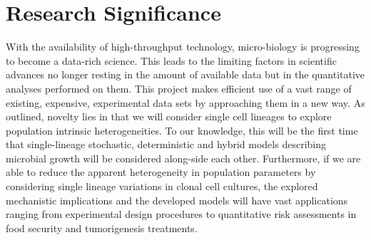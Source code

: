 \documentclass{bioinfo}
\begin{document}
\section{Research Significance}
With the availability of high-throughput technology, micro-biology is progressing to become a data-rich science. This leads to the limiting factors in scientific advances no longer resting in the amount of available data but in the quantitative analyses performed on them. This project makes efficient use of a vast range of existing, expensive, experimental data sets by approaching them in a new way. As outlined, novelty lies in that we will consider single cell lineages to explore population intrinsic heterogeneities. To our knowledge, this will be the first time that single-lineage stochastic, deterministic and hybrid models describing microbial growth will be considered along-side each other. Furthermore, if we are able to reduce the apparent heterogeneity in population parameters by considering single lineage variations in clonal cell cultures, the explored mechanistic implications and the developed models will have vast applications ranging from experimental design procedures to quantitative risk assessments in food security and tumorigenesis treatments. 
\end{document}
